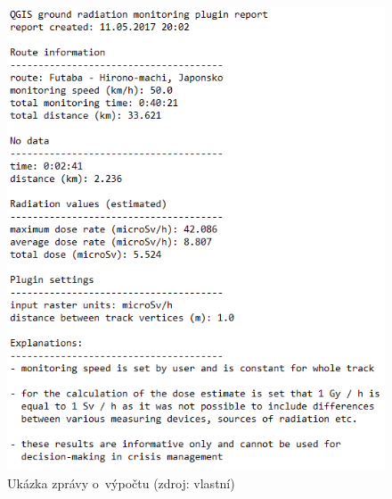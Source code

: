 \begin{enumerate}
\begin{itemize}
		\end{itemize}
	
			\begin{figure}[H] \centering
      			\includegraphics[scale=0.9]{./pictures/report.png}
      				\caption[Ukázka zprávy
o~výpočtu]{Ukázka zprávy o~výpočtu (zdroj: vlastní)}
     				\label{fig:report}
  			\end{figure}
  			

\end{enumerate}
